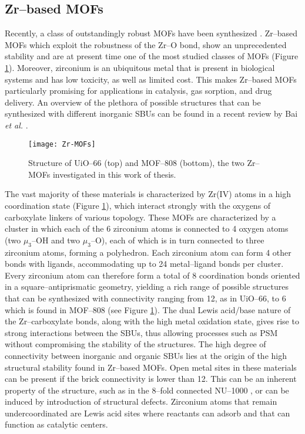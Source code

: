 \subsection*{Zr--based MOFs}
Recently, a class of outstandingly robust MOFs have been synthesized \cite{furukawa2014water}. Zr--based MOFs\cite{bai2016zr} which exploit the robustness of the Zr--O bond, show an unprecedented stability and are at present time one of the most studied classes of MOFs (Figure \ref{fig:Zr-MOFs}). Moreover, zirconium is an ubiquitous metal that is present in biological systems and has low toxicity, as well as limited cost. This makes Zr--based MOFs particularly promising for applications in catalysis, gas sorption, and drug delivery. An overview of the plethora of possible structures that can be synthesized with different inorganic SBUs can be found in a recent review by Bai \textit{et al.} \cite{bai2016zr}.
\begin{figure}[!htbp]
	\centering
 	\texttt{[image: Zr-MOFs]}
	\caption{Structure of UiO--66 (top) and MOF--808 (bottom), the two Zr--MOFs investigated in this work of thesis.}
	\label{fig:Zr-MOFs}
\end{figure}
\npar
The vast majority of these materials is characterized by Zr(IV) atoms in a high coordination state (Figure \ref{fig:Zr-MOFs}), which interact strongly with the oxygens of carboxylate linkers of various topology. These MOFs are characterized by a  cluster in which each of the 6 zirconium atoms is connected to 4 oxygen atoms (two $\mu_3$--OH and two $\mu_3$--O), each of which is in turn connected to three zirconium atoms, forming a polyhedron. Each zirconium atom can form 4 other bonds with ligands, accommodating up to 24 metal--ligand bonds per cluster. Every zirconium atom can therefore form a total of 8 coordination bonds oriented in a square--antiprismatic geometry, yielding a rich range of possible structures that can be synthesized with connectivity ranging from 12, as in UiO--66\cite{cavka2008new}, to 6 which is found in MOF--808\cite{furukawa2014water} (see Figure \ref{fig:Zr-MOFs}). The dual Lewis acid/base nature of the Zr--carboxylate bonds, along with the high metal oxidation state, gives rise to strong interactions between the SBUs, thus allowing processes such as PSM without compromising the stability of the structures. The high degree of connectivity between inorganic and organic SBUs lies at the origin of the high structural stability found in Zr--based MOFs\cite{bai2016zr, leus2016systematic}. Open metal sites in these materials can be present if the brick connectivity is lower than 12. This can be an inherent property of the structure, such as in the 8--fold connected NU--1000 \cite{mondloch2013vapor}, or can be induced by introduction of structural defects. Zirconium atoms that remain undercoordinated are Lewis acid sites where reactants can adsorb and that can function as catalytic centers.

